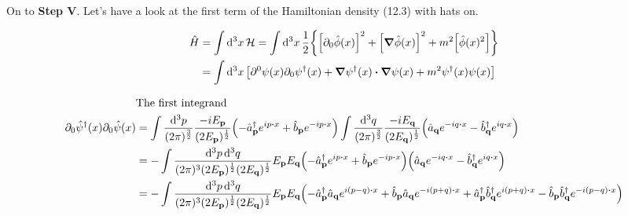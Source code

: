 \documentclass{article}
\begin{document}
On to \textbf{Step V}. Let's have a look at the first term of the Hamiltonian density (12.3) with hats on.

\begin{align*}
  \hat{H} & =\int\dd[3]{x}\mathcal{H}=\int\dd[3]{x}\frac{1}{2}\Bqty{\bqty{\partial_0\hat{\phi}(x)}^2+\bqty{\grad\hat{\phi}(x)}^2+m^2\bqty{\hat{\phi}(x)^2}} \\
          & =\int\dd[3]{x}\bqty{\partial^0\psi(x)\partial_0\psi^\dagger(x)+\grad\psi^\dagger(x)\vdot\grad\psi(x)+m^2\psi^\dagger(x)\psi(x)}
\end{align*}

\begin{align*}
                                                            & \qq*{The first integrand}                                                                                                                                                                                                                                                                                                                                             \\
  \partial_0 \hat{\psi}^\dagger (x)\partial_0 \hat{\psi}(x) & =\int \frac{\dd[3]{p}}{(2\pi)^\frac{3}{2}}  \frac{-iE_{\vb{p}}}{(2E_{\vb{p}})^{\frac{1}{2}}}\pqty{-\hat{a}^\dagger_{\vb{p}}e^{ip\vdot x}+\hat{b}_{\vb{p}}e^{-ip\vdot x}}\int \frac{\dd[3]{q}}{(2\pi)^\frac{3}{2}}  \frac{-iE_{\vb{q}}}{(2E_{\vb{q}})^{\frac{1}{2}}}  \pqty{\hat{a}_{\vb{q}}e^{-iq\vdot x}-\hat{b}^\dagger_{\vb{q}}e^{iq\vdot x}}                      \\
                                                            & =-\int \frac{\dd[3]{p}\dd[3]{q}}{(2\pi)^3(2E_{\vb{p}})^{\frac{1}{2}}(2E_{\vb{q}})^{\frac{1}{2}}}E_{\vb{p}}E_{\vb{q}}\pqty{-\hat{a}^\dagger_{\vb{p}}e^{ip\vdot x}+\hat{b}_{\vb{p}}e^{-ip\vdot x}}\pqty{\hat{a}_{\vb{q}}e^{-iq\vdot x}-\hat{b}^\dagger_{\vb{q}}e^{iq\vdot x}}                                                                                           \\
                                                            & =-\int \frac{\dd[3]{p}\dd[3]{q}}{(2\pi)^3(2E_{\vb{p}})^{\frac{1}{2}}(2E_{\vb{q}})^{\frac{1}{2}}}E_{\vb{p}}E_{\vb{q}}\pqty{-\hat{a}^\dagger_{\vb{p}}\hat{a}_{\vb{q}}e^{i(p-q)\vdot x}+\hat{b}_{\vb{p}}\hat{a}_{\vb{q}}e^{-i(p+q)\vdot x}+\hat{a}^\dagger_{\vb{p}}\hat{b}^\dagger_{\vb{q}}e^{i(p+q)\vdot x}-\hat{b}_{\vb{p}}\hat{b}^\dagger_{\vb{q}}e^{-i(p-q)\vdot x}}
\end{align*}
\end{document}
